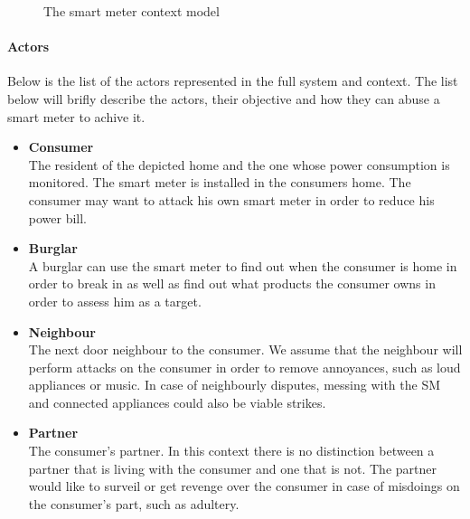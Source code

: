 \begin{figure}[h]
  \centering
  
  \caption{The smart meter context model}
  \label{contextual:sm_model}
\end{figure}

\paragraph{Actors}\label{contextActors}
Below is the list of the actors represented in the full system and context.
The list below will brifly describe the actors, their objective and how they can abuse a smart meter to achive it.
\begin{itemize}
\item \textbf{Consumer}\\
The resident of the depicted home and the one whose power consumption is monitored.
The smart meter is installed in the consumers home.
The consumer may want to attack his own smart meter in order to reduce his power bill.
\item \textbf{Burglar}\\ A burglar can use the smart meter to find out when the consumer is home in order to break in as well as find out what products the consumer owns in order to assess him as a target.
\item \textbf{Neighbour}\\
The next door neighbour to the consumer.
We assume that the neighbour will perform attacks on the consumer in order to remove annoyances, such as loud appliances or music.
In case of neighbourly disputes, messing with the SM and connected appliances could also be viable strikes.
\item \textbf{Partner}\\
The consumer's partner.
In this context there is no distinction between a partner that is living with the consumer and one that is not.
The partner would like to surveil or get revenge over the consumer in case of misdoings on the consumer's part, such as adultery.


\end{itemize}
